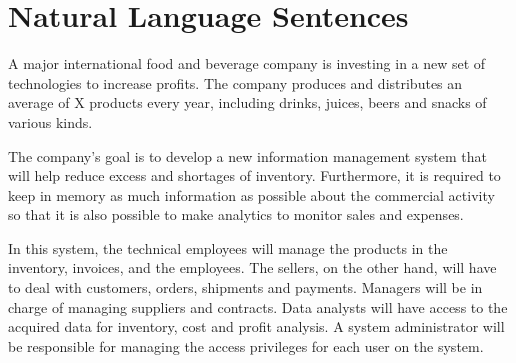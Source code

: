 \section{Natural Language Sentences}

A major international food and beverage company is investing in a new set of technologies to increase profits.
The company produces and distributes an average of X products every year, including drinks, juices, beers and snacks of various kinds.

The company's goal is to develop a new information management system that will help reduce excess and shortages of inventory.
Furthermore, it is required to keep in memory as much information as possible about the commercial activity so that
it is also possible to make analytics to monitor sales and expenses.

In this system, the technical employees will manage the products in the inventory, invoices, and the employees.
The sellers, on the other hand, will have to deal with customers, orders, shipments and payments.
Managers will be in charge of managing suppliers and contracts.
Data analysts will have access to the acquired data for inventory, cost and profit analysis.
A system administrator will be responsible for managing the access privileges for each user on the system.
